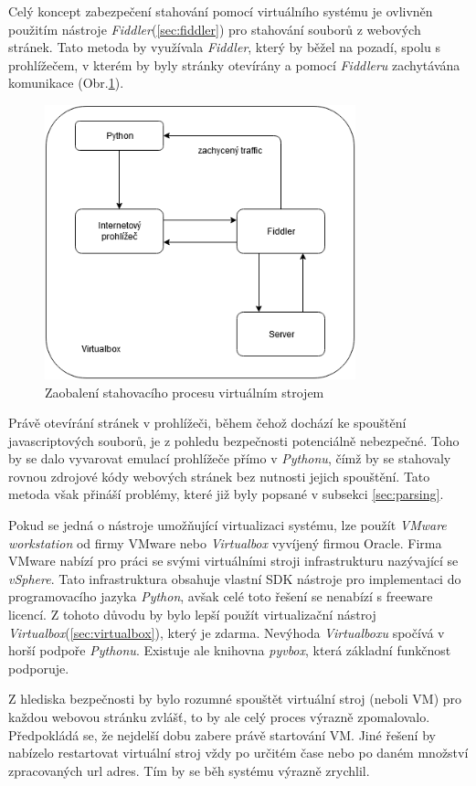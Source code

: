 \documentclass[thesis=M,czech,hidelinks]{FITthesis}[2013/05/06]
\begin{document}
Celý koncept zabezpečení stahování pomocí virtuálního systému je ovlivněn použitím nástroje \textit{Fiddler}(\ref{sec:fiddler}) pro stahování souborů z webových stránek. Tato metoda by využívala \textit{Fiddler}, který by běžel na pozadí, spolu s prohlížečem, v kterém by byly stránky otevírány a pomocí \textit{Fiddleru} zachytávána komunikace (Obr.\ref{fig:virtualbox}). 
\begin{figure}[h]
	\centering
	\includegraphics[width=9cm]{pictures/virtualbox.png}
	\caption{Zaobalení stahovacího procesu virtuálním strojem}
	\label{fig:virtualbox}
\end{figure}
Právě otevírání stránek v prohlížeči, během čehož dochází ke spouštění javascriptových souborů, je z pohledu bezpečnosti potenciálně nebezpečné. Toho by se dalo vyvarovat emulací prohlížeče přímo v \textit{Pythonu}, čímž by se stahovaly rovnou zdrojové kódy webových stránek bez nutnosti jejich spouštění. Tato metoda však přináší problémy, které již byly popsané v subsekci \ref{sec:parsing}.

Pokud se jedná o nástroje umožňující virtualizaci systému, lze použít \textit{VMware workstation} od firmy VMware nebo \textit{Virtualbox} vyvíjený firmou Oracle. Firma VMware nabízí pro práci se svými virtuálními stroji infrastrukturu nazývající se \textit{vSphere}. Tato infrastruktura obsahuje vlastní SDK nástroje pro implementaci do programovacího jazyka \textit{Python}\cite{vmware}, avšak celé toto řešení se nenabízí s freeware licencí. Z tohoto důvodu by bylo lepší použít virtualizační nástroj \textit{Virtualbox}(\ref{sec:virtualbox}), který je zdarma. Nevýhoda \textit{Virtualboxu} spočívá v horší podpoře \textit{Pythonu}. Existuje ale knihovna \textit{pyvbox}\cite{pyvbox}, která základní funkčnost podporuje. 

Z hlediska bezpečnosti by bylo rozumné spouštět virtuální stroj (neboli VM) pro každou webovou stránku zvlášť, to by ale celý proces výrazně zpomalovalo. Předpokládá se, že nejdelší dobu zabere právě startování VM.  Jiné řešení by nabízelo restartovat virtuální stroj vždy po určitém čase nebo po daném množství zpracovaných url adres. Tím by se běh systému výrazně zrychlil.
\end{document}
